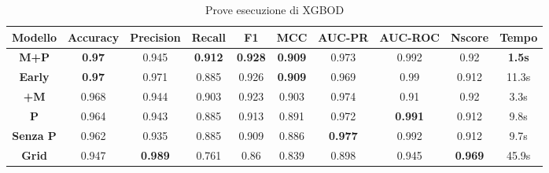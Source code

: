 \begin{table}[h!]
    \centering
    \begin{adjustbox}{max width=\textwidth}
        \begin{tabular}{|c|c|c|c|c|c|c|c|c|c|}
        \hline
        \textbf{Modello} & \textbf{Accuracy} &\textbf{Precision}  & \textbf{Recall} & \textbf{F1} & \textbf{MCC} & \textbf{AUC-PR} & \textbf{AUC-ROC} & \textbf{Nscore} & \textbf{Tempo}\\
     \hline
            \textbf{M+P} & \textbf{0.97} & 0.945 & \textbf{0.912} &\textbf{0.928}  & \textbf{0.909} & 0.973 & 0.992 &0.92 & \textbf{1.5s}\\
            \hline
             \textbf{Early}& \textbf{0.97} & 0.971 & 0.885 & 0.926 & \textbf{0.909} & 0.969 & 0.99 & 0.912 & 11.3s\\
             \hline
             \textbf{+M}& 0.968 & 0.944 & 0.903 & 0.923 & 0.903 & 0.974 & 0.91 & 0.92 & 3.3s\\
             \hline
             \textbf{P}& 0.964 & 0.943 & 0.885 & 0.913 & 0.891 & 0.972 & \textbf{0.991} & 0.912 &9.8s\\
             \hline
             \textbf{Senza P}& 0.962 & 0.935 & 0.885 & 0.909 & 0.886 & \textbf{0.977} & 0.992 & 0.912 &9.7s\\
             \hline
             \textbf{Grid}& 0.947 & \textbf{0.989} & 0.761 & 0.86 & 0.839 & 0.898 & 0.945 & \textbf{0.969} &45.9s \\
             \hline
        \end{tabular}
    \end{adjustbox}
    \caption{Prove esecuzione di XGBOD}
    \label{tab:XGBOD_table}
\end{table}